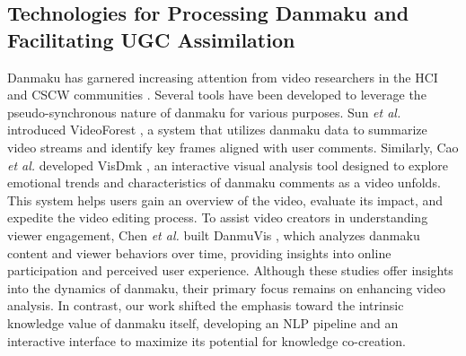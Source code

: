\subsection{Technologies for Processing Danmaku and Facilitating UGC Assimilation}
Danmaku has garnered increasing attention from video researchers in the HCI and CSCW communities \cite{ma2017video, wu2018danmaku, he2021beyond, wu2019danmaku}. Several tools have been developed to leverage the pseudo-synchronous nature of danmaku for various purposes. Sun \textit{et al.} introduced VideoForest \cite{sun2016videoforest}, a system that utilizes danmaku data to summarize video streams and identify key frames aligned with user comments. Similarly, Cao \textit{et al.} developed VisDmk \cite{cao2023visdmk}, an interactive visual analysis tool designed to explore emotional trends and characteristics of danmaku comments as a video unfolds. This system helps users gain an overview of the video, evaluate its impact, and expedite the video editing process. To assist video creators in understanding viewer engagement, Chen \textit{et al.} built DanmuVis \cite{chen2022danmuvis}, which analyzes danmaku content and viewer behaviors over time, providing insights into online participation and perceived user experience.
Although these studies offer insights into the dynamics of danmaku, their primary focus remains on enhancing video analysis. In contrast, our work shifted the emphasis toward the intrinsic knowledge value of danmaku itself, developing an NLP pipeline and an interactive interface to maximize its potential for knowledge co-creation.

